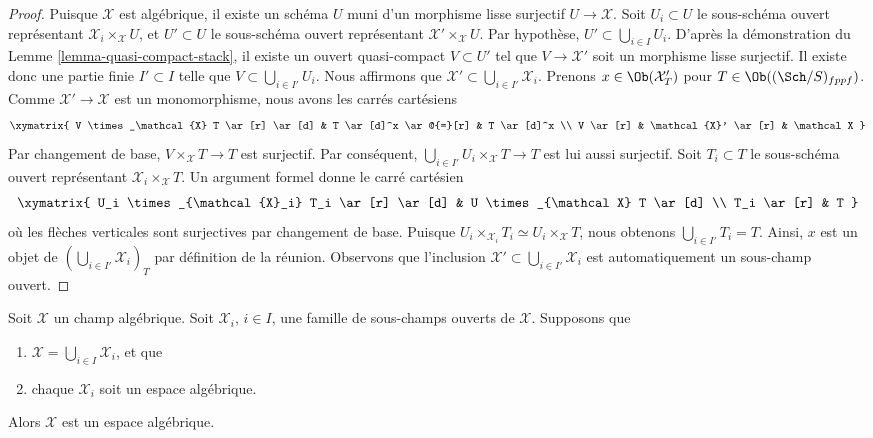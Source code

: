 \begin{proof}
Puisque $\mathcal X$ est algébrique, il existe un schéma $U$ muni d'un morphisme
lisse surjectif $U \to \mathcal X$. Soit $U_i \subset U$ le sous-schéma ouvert
représentant $\mathcal{X}_i \times_{\mathcal X} U$, et $U' \subset U$ le
sous-schéma ouvert représentant $\mathcal{X}' \times_{\mathcal X} U$. Par
hypothèse, $U'\subset \bigcup_{i\in I} U_i$. D'après la démonstration du
Lemme \ref{lemma-quasi-compact-stack},
il existe un ouvert quasi-compact $V \subset U'$ tel que $V \to \mathcal{X}'$
soit un morphisme lisse surjectif. Il existe donc une partie finie
$I' \subset I$ telle que $V \subset \bigcup_{i \in I'}
U_i$. Nous affirmons que $\mathcal{X}' \subset \bigcup_{i \in I'} \mathcal{X}_i$.
Prenons $x \in \Ob(\mathcal{X}'_T)$ pour
$T \in \Ob((\Sch/S)_{fppf})$.
Comme $\mathcal{X}' \to \mathcal{X}$ est un monomorphisme, nous avons les carrés
cartésiens
$$
\xymatrix{
V \times_\mathcal{X} T \ar[r] \ar[d] &
T \ar[d]^x \ar@{=}[r] &
T \ar[d]^x \\
V \ar[r] &
\mathcal{X}' \ar[r] &
\mathcal X
}
$$
Par changement de base, $V \times_{\mathcal X} T \to T$ est surjectif. Par conséquent,
$\bigcup_{i \in I'} U_i \times_{\mathcal X} T \to T$ est lui aussi surjectif.
Soit $T_i \subset T$ le sous-schéma ouvert représentant
$\mathcal{X}_i \times_{\mathcal X} T$.
Un argument formel donne le carré cartésien
$$
\xymatrix{
U_i \times_{\mathcal{X}_i} T_i \ar[r] \ar[d] &
U \times_{\mathcal X} T \ar[d] \\
T_i \ar[r] & T
}
$$
où les flèches verticales sont surjectives par changement de base. Puisque
$U_i \times_{\mathcal{X}_i} T_i \simeq U_i \times_{\mathcal X} T$,
nous obtenons $\bigcup_{i \in I'} T_i = T$. Ainsi,
$x$ est un objet de $(\bigcup_{i\in I'} \mathcal{X}_i)_T$ par
définition de la réunion. Observons que l'inclusion
$\mathcal{X}' \subset \bigcup_{i \in I'} \mathcal{X}_i$
est automatiquement un sous-champ ouvert.
\end{proof}

\begin{lemma}
\label{lemma-zariski-open-cover-stack-is-space}
Soit $\mathcal X$ un champ algébrique.
Soit $\mathcal{X}_i$, $i \in I$, une famille de sous-champs ouverts de $\mathcal{X}$.
Supposons que
\begin{enumerate}
\item $\mathcal{X} = \bigcup_{i \in I} \mathcal{X}_i$, et que
\item chaque $\mathcal{X}_i$ soit un espace algébrique.
\end{enumerate}
Alors $\mathcal{X}$ est un espace algébrique.
\end{lemma}

